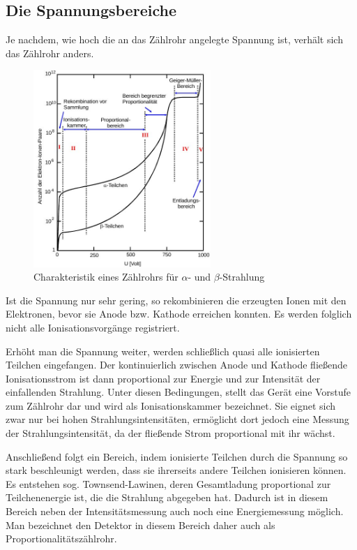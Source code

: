 \subsection{Die Spannungsbereiche}
\label{sec_spannungsbereiche}
Je nachdem, wie hoch die an das Zählrohr angelegte Spannung ist, verhält sich das Zählrohr anders.

\begin{figure}[h]
\includegraphics[width=0.6\textwidth]{pics/charak.jpg}
\caption{Charakteristik eines Zählrohrs für $\alpha$- und $\beta$-Strahlung}
\end{figure}

Ist die Spannung nur sehr gering, so rekombinieren die erzeugten Ionen mit den Elektronen, bevor sie Anode bzw. Kathode erreichen konnten. Es werden folglich nicht alle Ionisationsvorgänge registriert.

Erhöht man die Spannung weiter, werden schließlich quasi alle ionisierten Teilchen eingefangen. Der kontinuierlich zwischen Anode und Kathode fließende Ionisationsstrom ist dann proportional zur Energie und zur Intensität der einfallenden Strahlung. Unter diesen Bedingungen, stellt das Gerät eine Vorstufe zum Zählrohr dar und wird als Ionisationskammer bezeichnet. Sie eignet sich zwar nur bei hohen Strahlungsintensitäten, ermöglicht dort jedoch eine Messung der Strahlungsintensität, da der fließende Strom proportional mit ihr wächst.

Anschließend folgt ein Bereich, indem ionisierte Teilchen durch die Spannung so stark beschleunigt werden, dass sie ihrerseits andere Teilchen ionisieren können. Es entstehen sog. Townsend-Lawinen, deren Gesamtladung proportional zur Teilchenenergie ist, die die Strahlung abgegeben hat. Dadurch ist in diesem Bereich neben der Intensitätsmessung auch noch eine Energiemessung möglich. Man bezeichnet den Detektor in diesem Bereich daher auch als Proportionalitätszählrohr.

